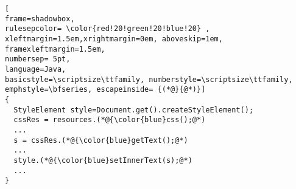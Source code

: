     \begin{lstlisting}[
frame=shadowbox,
rulesepcolor= \color{red!20!green!20!blue!20} ,
xleftmargin=1.5em,xrightmargin=0em, aboveskip=1em,
framexleftmargin=1.5em,
numbersep= 5pt,
language=Java,
basicstyle=\scriptsize\ttfamily, numberstyle=\scriptsize\ttfamily, emphstyle=\bfseries, escapeinside= {(*@}{@*)}]
{
  StyleElement style=Document.get().createStyleElement();
  cssRes = resources.(*@{\color{blue}css();@*)
  ...
  s = cssRes.(*@{\color{blue}getText();@*)
  ...
  style.(*@{\color{blue}setInnerText(s);@*)
  ...
}                
\end{lstlisting}
